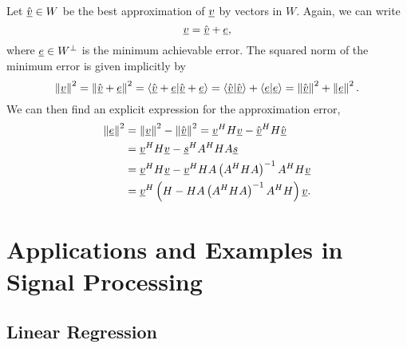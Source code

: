 Let $\hat{\underline{v}} \in W$ be the best approximation of $\underline{v}$ by vectors in $W$.
Again, we can write
\begin{equation*}
\underline{v} = \hat{\underline{v}} + \underline{e},
\end{equation*}
where $\underline{e} \in W^{\bot}$ is the minimum achievable error.
The squared norm of the minimum error is given implicitly by
\begin{equation*}
\left\| \underline{v} \right\|^2
= \left\| \hat{\underline{v}} + \underline{e} \right\|^2
= \left\langle \hat{\underline{v}} + \underline{e} | \hat{\underline{v}} + \underline{e} \right\rangle
= \left\langle \hat{\underline{v}} | \hat{\underline{v}} \right\rangle
+ \left\langle \underline{e} | \underline{e} \right\rangle
= \left\| \hat{\underline{v}} \right\|^2 + \left\| \underline{e} \right\|^2 .
\end{equation*}
We can then find an explicit expression for the approximation error,
\begin{equation*}
\begin{split}
\left\| \underline{e} \right\|^2
&= \left\| \underline{v} \right\|^2
- \left\| \hat{\underline{v}} \right\|^2
= \underline{v}^H H \underline{v} - \hat{\underline{v}}^H H \hat{\underline{v}} \\
&= \underline{v}^H H \underline{v} - \underline{s}^H A^H H A \underline{s} \\
&= \underline{v}^H H \underline{v}
- \underline{v}^H H A \left( A^H H A \right)^{-1} A^H H \underline{v} \\
&= \underline{v}^H
\left( H -  H A \left( A^H H A \right)^{-1} A^H H \right)
\underline{v}.
\end{split}
\end{equation*}


\section{Applications and Examples in Signal Processing}

\subsection{Linear Regression}

